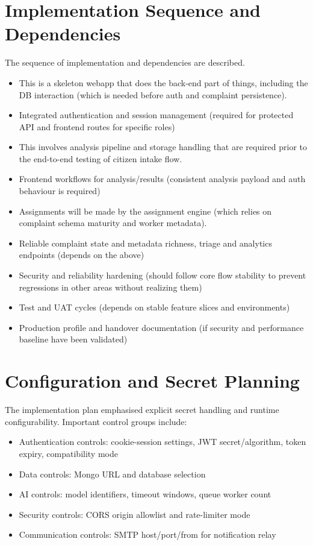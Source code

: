 \section{Implementation Sequence and Dependencies}

The sequence of implementation and dependencies are described.

\begin{itemize}
\item This is a skeleton webapp that does the back-end part of things, including the DB interaction (which is needed before auth and complaint persistence).
\item Integrated authentication and session management (required for protected API and frontend routes for specific roles)
\item This involves analysis pipeline and storage handling that are required prior to the end-to-end testing of citizen intake flow.
\item Frontend workflows for analysis/results (consistent analysis payload and auth behaviour is required)
\item Assignments will be made by the assignment engine (which relies on complaint schema maturity and worker metadata).
\item Reliable complaint state and metadata richness, triage and analytics endpoints (depends on the above)
\item Security and reliability hardening (should follow core flow stability to prevent regressions in other areas without realizing them)
\item Test and UAT cycles (depends on stable feature slices and environments)
\item Production profile and handover documentation (if security and performance baseline have been validated)
\end{itemize}

\section{Configuration and Secret Planning}

The implementation plan emphasised explicit secret handling and runtime configurability. Important control groups include:

\begin{itemize}
\item Authentication controls: cookie-session settings, JWT secret/algorithm, token expiry, compatibility mode
\item Data controls: Mongo URL and database selection
\item AI controls: model identifiers, timeout windows, queue worker count
\item Security controls: CORS origin allowlist and rate-limiter mode
\item Communication controls: SMTP host/port/from for notification relay
\end{itemize}

